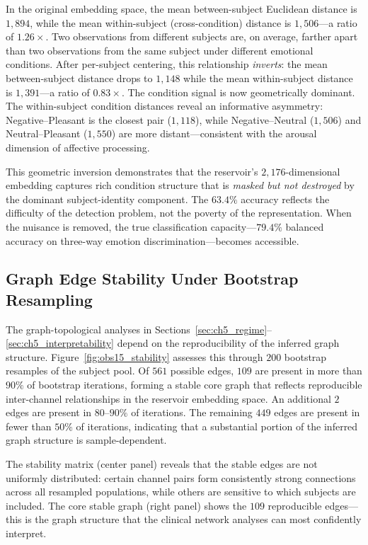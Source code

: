 In the original embedding space, the mean between-subject Euclidean distance is $1{,}894$, while the mean within-subject (cross-condition) distance is $1{,}506$---a ratio of $1.26\times$. Two observations from different subjects are, on average, farther apart than two observations from the same subject under different emotional conditions. After per-subject centering, this relationship \emph{inverts}: the mean between-subject distance drops to $1{,}148$ while the mean within-subject distance is $1{,}391$---a ratio of $0.83\times$. The condition signal is now geometrically dominant. The within-subject condition distances reveal an informative asymmetry: Negative--Pleasant is the closest pair ($1{,}118$), while Negative--Neutral ($1{,}506$) and Neutral--Pleasant ($1{,}550$) are more distant---consistent with the arousal dimension of affective processing.

This geometric inversion demonstrates that the reservoir's $2{,}176$-dimensional embedding captures rich condition structure that is \emph{masked but not destroyed} by the dominant subject-identity component. The $63.4\%$ accuracy reflects the difficulty of the detection problem, not the poverty of the representation. When the nuisance is removed, the true classification capacity---$79.4\%$ balanced accuracy on three-way emotion discrimination---becomes accessible.

\subsection{Graph Edge Stability Under Bootstrap Resampling}

The graph-topological analyses in Sections~\ref{sec:ch5_regime}--\ref{sec:ch5_interpretability} depend on the reproducibility of the inferred graph structure. Figure~\ref{fig:obs15_stability} assesses this through $200$ bootstrap resamples of the subject pool. Of $561$ possible edges, $109$ are present in more than $90\%$ of bootstrap iterations, forming a stable core graph that reflects reproducible inter-channel relationships in the reservoir embedding space. An additional $2$ edges are present in $80$--$90\%$ of iterations. The remaining $449$ edges are present in fewer than $50\%$ of iterations, indicating that a substantial portion of the inferred graph structure is sample-dependent.

The stability matrix (center panel) reveals that the stable edges are not uniformly distributed: certain channel pairs form consistently strong connections across all resampled populations, while others are sensitive to which subjects are included. The core stable graph (right panel) shows the $109$ reproducible edges---this is the graph structure that the clinical network analyses can most confidently interpret.

